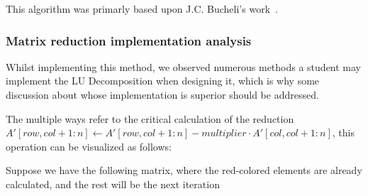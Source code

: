 This algorithm was primarly based upon J.C. Bucheli's work~\cite{bucheli2020}.

\subsubsection{Matrix reduction implementation analysis}
Whilst implementing this method, we observed numerous methods a student may implement the LU Decomposition when designing it, which is why some discussion about whose implementation is superior should be addressed.

The multiple ways refer to the critical calculation of the reduction $ A'[row, col+1:n] \gets A'[row, col+1:n] - multiplier \cdot A'[col, col+1:n] $, this operation can be visualized as follows:

Suppose we have the following matrix, where the red-colored elements are already calculated, and the rest will be the next iteration
